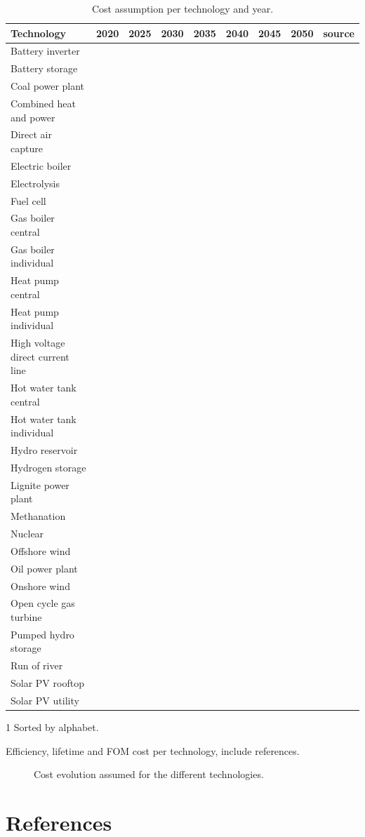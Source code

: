 \documentclass[3p]{elsarticle} %
\begin{document}
\begin{table}[!b]
\begin{threeparttable}
\caption{Cost assumption per technology and year.} \label{tab:cost per year}
\centering
\begin{tabularx}{\textwidth}{l|c|c|c|c|c|c|c|r}
\toprule
Technology\tnote{1}&2020&2025&2030&2035&2040&2045&2050&source\\
\midrule
Battery inverter\\
Battery storage\\
Coal power plant\\
Combined heat and power\\
Direct air capture\\
Electric boiler\\
Electrolysis\\
Fuel cell\\
Gas boiler central\\
Gas boiler individual\\
Heat pump central\\
Heat pump individual\\
High voltage direct current line\\
Hot water tank central\\
Hot water tank individual\\
Hydro reservoir\\
Hydrogen storage\\
Lignite power plant\\
Methanation\\
Nuclear\\
Offshore wind \\
Oil power plant\\
Onshore wind \\
Open cycle gas turbine\\
Pumped hydro storage\\
Run of river\\
Solar PV rooftop\\
Solar PV utility\\
\bottomrule
\end{tabularx}
\begin{tablenotes}
\item[1] Sorted by alphabet.
\end{tablenotes}
\end{threeparttable}
\end{table}

\begin{table}
\caption{Efficiency, lifetime and FOM cost per technology, include references.}
\end{table}

\begin{figure}[!h]
\centering
\caption{Cost evolution assumed for the different technologies. } \label{fig_cost_evolution} 
\end{figure}


 
\section{References}

\end{document}
